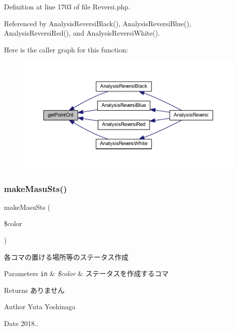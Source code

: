 Definition at line 1703 of file Reversi.\+php.



Referenced by Analysis\+Reversi\+Black(), Analysis\+Reversi\+Blue(), Analysis\+Reversi\+Red(), and Analysis\+Reversi\+White().

Here is the caller graph for this function\+:
\nopagebreak
\begin{figure}[H]
\begin{center}
\leavevmode
\includegraphics[width=350pt]{class_reversi_af538d04718f177f71461f582f3bd8eba_icgraph}
\end{center}
\end{figure}
\mbox{\label{class_reversi_a88869682786bb7c45c3488113deaa789}} 
\subsubsection{\texorpdfstring{make\+Masu\+Sts()}{makeMasuSts()}}
{\footnotesize\ttfamily make\+Masu\+Sts (\begin{DoxyParamCaption}\item[{}]{\$color }\end{DoxyParamCaption})\hspace{0.3cm}{\ttfamily [private]}}



各コマの置ける場所等のステータス作成 


\begin{DoxyParams}[1]{Parameters}
\mbox{\tt in}  & {\em \$color} & ステータスを作成するコマ \\
\hline
\end{DoxyParams}
\begin{DoxyReturn}{Returns}
ありません 
\end{DoxyReturn}
\begin{DoxyAuthor}{Author}
Yuta Yoshinaga 
\end{DoxyAuthor}
\begin{DoxyDate}{Date}
2018.. 
\end{DoxyDate}


